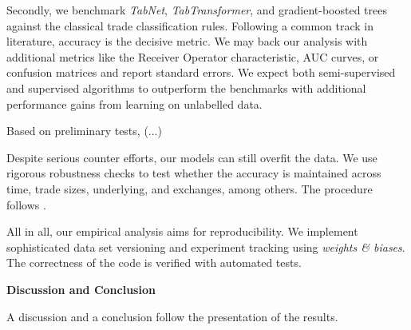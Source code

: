 Secondly, we benchmark \textit{TabNet}, \textit{TabTransformer}, and gradient-boosted trees against the classical trade classification rules. Following a common track in literature, accuracy is the decisive metric. We may back our analysis with additional metrics like the Receiver Operator characteristic, \gls{AUC} curves, or confusion matrices and report standard errors. We expect both semi-supervised and supervised algorithms to outperform the benchmarks with additional performance gains from learning on unlabelled data.

Based on preliminary tests, (...)

Despite serious counter efforts, our models can still overfit the data. We use rigorous robustness checks to test whether the accuracy is maintained across time, trade sizes, underlying, and exchanges, among others. The procedure follows \textcites{grauerOptionTradeClassification2022}{savickasInferringDirectionOption2003}{ronenMachineLearningTrade2022}.

All in all, our empirical analysis aims for reproducibility. We implement sophisticated data set versioning and experiment tracking using \textit{weights \& biases}. The correctness of the code is verified with automated tests. 

\textbf{Discussion and Conclusion}

A discussion and a conclusion follow the presentation of the results.


